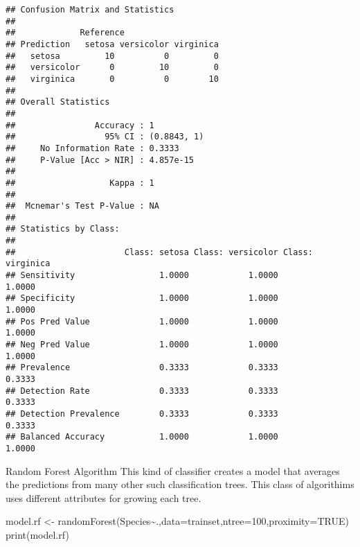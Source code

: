 \documentclass[
]{article}
\newenvironment{Shaded}{\begin{snugshade}}{\end{snugshade}}
\newcommand{\AttributeTok}[1]{\textcolor[rgb]{0.77,0.63,0.00}{#1}}
\newcommand{\CommentTok}[1]{\textcolor[rgb]{0.56,0.35,0.01}{\textit{#1}}}
\newcommand{\ConstantTok}[1]{\textcolor[rgb]{0.00,0.00,0.00}{#1}}
\newcommand{\DecValTok}[1]{\textcolor[rgb]{0.00,0.00,0.81}{#1}}
\newcommand{\FunctionTok}[1]{\textcolor[rgb]{0.00,0.00,0.00}{#1}}
\newcommand{\NormalTok}[1]{#1}
\newcommand{\OtherTok}[1]{\textcolor[rgb]{0.56,0.35,0.01}{#1}}
\newcommand{\SpecialCharTok}[1]{\textcolor[rgb]{0.00,0.00,0.00}{#1}}
\begin{document}
\begin{Shaded}
\end{Shaded}

\begin{verbatim}
## Confusion Matrix and Statistics
## 
##             Reference
## Prediction   setosa versicolor virginica
##   setosa         10          0         0
##   versicolor      0         10         0
##   virginica       0          0        10
## 
## Overall Statistics
##                                      
##                Accuracy : 1          
##                  95% CI : (0.8843, 1)
##     No Information Rate : 0.3333     
##     P-Value [Acc > NIR] : 4.857e-15  
##                                      
##                   Kappa : 1          
##                                      
##  Mcnemar's Test P-Value : NA         
## 
## Statistics by Class:
## 
##                      Class: setosa Class: versicolor Class: virginica
## Sensitivity                 1.0000            1.0000           1.0000
## Specificity                 1.0000            1.0000           1.0000
## Pos Pred Value              1.0000            1.0000           1.0000
## Neg Pred Value              1.0000            1.0000           1.0000
## Prevalence                  0.3333            0.3333           0.3333
## Detection Rate              0.3333            0.3333           0.3333
## Detection Prevalence        0.3333            0.3333           0.3333
## Balanced Accuracy           1.0000            1.0000           1.0000
\end{verbatim}

Random Forest Algorithm This kind of classifier creates a model that
averages the predictions from many other such classification trees. This
class of algorithims uses different attributes for growing each tree.

\begin{Shaded}
\begin{Highlighting}[]
\NormalTok{model.rf }\OtherTok{\textless{}{-}} \FunctionTok{randomForest}\NormalTok{(Species}\SpecialCharTok{\textasciitilde{}}\NormalTok{.,}\AttributeTok{data=}\NormalTok{trainset,}\AttributeTok{ntree=}\DecValTok{100}\NormalTok{,}\AttributeTok{proximity=}\ConstantTok{TRUE}\NormalTok{)}
\FunctionTok{print}\NormalTok{(model.rf)}
\end{Highlighting}
\end{Shaded}
\end{document}
